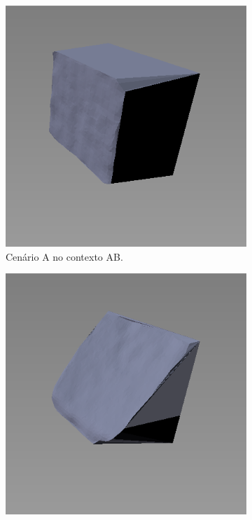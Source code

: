 \begin{figure}[H]
    \centering
    \caption{Reconstrução dos cenários nos contextos.}
    \label{fig:recontrucao_virtual}
    \begin{subfigure}[t]{0.33\textwidth}
        \includegraphics[width=\textwidth]{dados/figuras/AC1.png}
        \caption{Cenário A no contexto AB.}
    \end{subfigure}
    \hspace{1em}
    \begin{subfigure}[t]{0.33\textwidth}
        \includegraphics[width=\textwidth]{dados/figuras/AC2.png}

\end{subfigure}
\end{figure}
